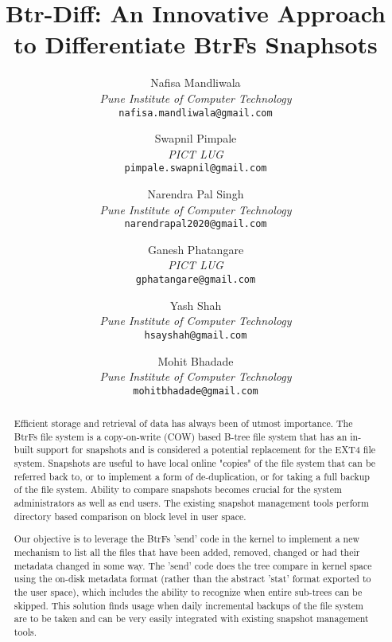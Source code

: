 \documentclass[final]{ols}
\begin{document}
\title{Btr-Diff: An Innovative Approach to Differentiate BtrFs Snaphsots}

\author{
	Nafisa Mandliwala \\
	{\em Pune Institute of Computer Technology}\\
	{\tt\small {nafisa.mandliwala}{@}{gmail.com}}\\
\and
	Swapnil Pimpale\\
	{\em PICT LUG }\\
	{\tt\small {pimpale.swapnil}{@}{gmail.com}}\\
\and
	Narendra Pal Singh\\
	{\em Pune Institute of Computer Technology}\\
	{\tt\small narendrapal2020{@}gmail.com}
\and
	Ganesh Phatangare\\
	{\em PICT LUG}\\
	{\tt\small gphatangare{@}gmail.com}
\and
	Yash Shah\\
	{\em Pune Institute of Computer Technology}\\
	{\tt\small hsayshah{@}gmail.com}
\and
	Mohit Bhadade\\
	{\em Pune Institute of Computer Technology}\\
	{\tt\small mohitbhadade{@}gmail.com}
}

\date{} %

\maketitle


\begin{abstract}
Efficient storage and retrieval of data has always been of utmost importance. The BtrFs file system is a copy-on-write (COW) based B-tree file system that has an in-built support for snapshots and is considered a potential replacement for the EXT4 file system. Snapshots are useful to have local online "copies" of the file system that can be referred back to, or to implement a form of de-duplication, or for taking a full backup of the file system. Ability to compare snapshots becomes crucial for the system administrators as well as end users. The existing snapshot management tools perform directory based comparison on block level in user space.

Our objective is to leverage the BtrFs 'send' code in the kernel to implement a new mechanism to list all the files that have been added, removed, changed or had their metadata changed in some way. The 'send' code does the tree compare in kernel space using the on-disk metadata format (rather than the abstract 'stat' format exported to the user space), which includes the ability to recognize when entire sub-trees can be skipped. This solution finds usage when daily incremental backups of the file system are to be taken and can be very easily integrated with existing snapshot management tools.
\end{abstract}
\end{document}
